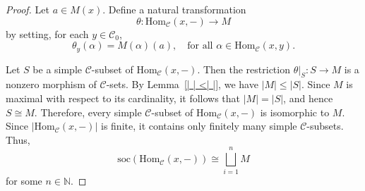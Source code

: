 \documentclass[a4paper]{article}
\theoremstyle{definition}
\theoremstyle{remark}
\newcommand*{\cat}[1]{\mathcal{#1}}
\begin{document}
\begin{proof}
Let $a \in M(x)$. Define a natural transformation
\[
\theta \colon \mathrm{Hom}_{\cat{C}}(x,-) \longrightarrow M
\]
by setting, for each $y \in \cat{C}_0$,
\[
\theta_y(\alpha)=M(\alpha)(a), \quad \text{for all } \alpha \in \mathrm{Hom}_{\cat{C}}(x,y).
\]

Let $S$ be a simple $\cat{C}$-subset of $\mathrm{Hom}_{\cat{C}}(x,-)$. Then the restriction $\theta|_S \colon S \to M$ is a nonzero morphism of $\cat{C}$-sets. By Lemma~\ref{| | <| |}, we have $|M| \leq |S|$. Since $M$ is maximal with respect to its cardinality, it follows that $|M| = |S|$, and hence $S \cong M$.
Therefore, every simple $\cat{C}$-subset of $\mathrm{Hom}_{\cat{C}}(x,-)$ is isomorphic to $M$. Since $|\mathrm{Hom}_{\cat{C}}(x,-)|$ is finite, it contains only finitely many simple $\cat{C}$-subsets. Thus,
\[
\mathrm{soc}(\mathrm{Hom}_{\cat{C}}(x,-)) \cong \bigsqcup_{i=1}^n M
\]
for some $n \in \mathbb{N}$.
\end{proof}
    
\end{document}
